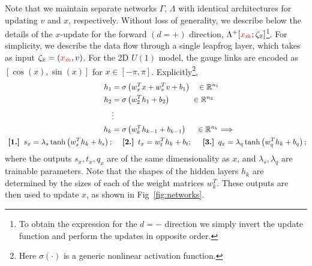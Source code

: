 \documentclass[a4paper,11pt]{article}
\newcommand{\xmaskbar}{\textcolor{red}{x_{\bar{m}}}}
\begin{document}
Note that we maintain separate networks \(\Gamma\), \(\Lambda\) with
identical architectures for updating \(v\) and \(x\), respectively.
%
Without loss of generality, we describe below the details of the \(x\)-update
for the forward \((d = +)\) direction, \(\Lambda^{+}[\xmaskbar;
\zeta_{\bar{x}}]\)\footnote{
    To obtain the expression for the \(d=-\) direction we simply invert the
    update function and perform the updates in opposite order.
}.
%
For simplicity, we describe the data flow through a single leapfrog layer,
%
which takes as input \(\zeta_{\bar{x}} = (\xmaskbar, v)\). For the 2D \(U(1)\)
model, the gauge links are encoded as \([\cos(x), \sin(x)]\) for \(x \in [-\pi,
\pi]\).
%
Explicitly\footnote{
    Here \(\sigma(\cdot)\) is a generic nonlinear activation function.
},
%
\begin{align}
    h_{1} &= \sigma\left(w_{x}^{T} x + w_{v}^{T} v + b_{1}\right)
        \quad \in \mathbb{R}^{n_{1}} \\
    h_{2} &= \sigma\left(w_{2}^{T} h_{1} + b_{2}\right)
        \hspace{0.085\textwidth} \in \mathbb{R}^{n_{2}} \\
    \nonumber& \vdots\\
    h_{k} &= \sigma\left(w_{k}^{T} h_{k-1} + b_{k-1}\right)
        \hspace{0.04\textwidth} \in \mathbb{R}^{n_{k}} \Longrightarrow \\
    \nonumber
    \textbf{  [1.]  } s_{x} = \lambda_{s} \tanh \left( w^{T}_{s} h_{k} + b_{s} \right);
    &\quad\textbf{  [2.]  } t_{x} = w^{T}_{t} h_{k} + b_{t};
    \quad\textbf{  [3.]  } q_{x} = \lambda_{q}\tanh\left(w^{T}_{q} h_{k} + b_{q}\right);
\end{align}
%
where the outputs \(s_{x}, t_{x}, q_{x}\) are of the same dimensionality as
\(x\), and \(\lambda_{s}, \lambda_{q}\) are trainable parameters.
%
Note that the shapes of the hidden layers \(h_{k}\) are determined by the sizes
of each of the weight matrices \(w_{k}^{T}\).
%
These outputs are then used to update \(x\), as shown in
Fig~\ref{fig:networks}.
\end{document}

